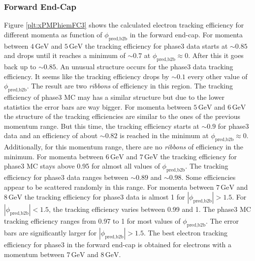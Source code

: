 \documentclass[a4paper,11pt,twosided,final,german,openbib,pdftex,listof=totoc,bibliography=totoc]{scrbook}
\begin{document}
\subsubsection{Forward End-Cap}

Figure \ref{plt:xPMPhiemFC3} shows the calculated electron tracking efficiency for different momenta as function of $\phi_{\textrm{pred,b2b}}$ in the forward end-cap.
For momenta between $4\,\textrm{GeV}$ and $5\,\textrm{GeV}$ the tracking efficiency for phase3 data starts at $\sim 0.85$ and drops until it reaches a minimum of $\sim 0.7$ at $\phi_{\textrm{pred,b2b}} \approx 0$. After this it goes back up to $\sim 0.85$. An unusual structure occurs for the phase3 data tracking efficiency. It seems like the tracking efficiency drops by $\sim 0.1$ every other value of $\phi_{\textrm{pred,b2b}}$. The result are two \textit{ribbons} of efficiency in this region. The tracking efficiency of phase3 MC may has a similar structure but due to the lower statistics the error bars are way bigger.
For momenta between $5\,\textrm{GeV}$ and $6\,\textrm{GeV}$ the structure of the tracking efficiencies are similar to the ones of the previous momentum range. But this time, the tracking efficiency starts at $\sim 0.9$ for phase3 data and an efficiency of about $\sim 0.82$ is reached in the minimum at $\phi_{\textrm{pred,b2b}} \approx 0$. Additionally, for this momentum range, there are no \textit{ribbons} of efficiency in the minimum.
For momenta between $6\,\textrm{GeV}$ and $7\,\textrm{GeV}$ the tracking efficiency for phase3 MC stays above 0.95 for almost all values of $\phi_{\textrm{pred,b2b}}$. The tracking efficiency for phase3 data ranges between $\sim 0.89$ and $\sim 0.98$. Some efficiencies appear to be scattered randomly in this range.
For momenta between $7\,\textrm{GeV}$ and $8\,\textrm{GeV}$ the tracking efficiency for phase3 data is almost 1 for $|\phi_{\textrm{pred,b2b}}| > 1.5$. For $|\phi_{\textrm{pred,b2b}}| < 1.5$, the tracking efficiency varies between 0.99 and 1. The phase3 MC tracking efficiency ranges from 0.97 to 1 for most values of $\phi_{\textrm{pred,b2b}}$. The error bars are significantly larger for $|\phi_{\textrm{pred,b2b}}| > 1.5$.
The best electron tracking efficiency for phase3 in the forward end-cap is obtained for electrons with a momentum between $7\,\textrm{GeV}$ and $8\,\textrm{GeV}$.
\end{document}
